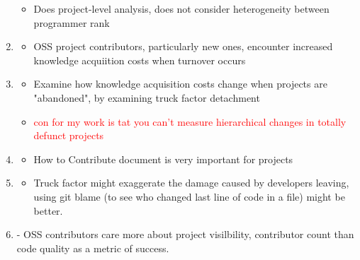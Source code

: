 \documentclass[12pt,notitlepage]{article}
\begin{document}
\begin{enumerate}
\begin{itemize}
        \item Does project-level analysis, does not consider heterogeneity between programmer rank 
    \end{itemize}
    \item \cite{rashid_exploring_2017} 
    \begin{itemize}
        \item OSS project contributors, particularly new ones, encounter increased knowledge acquiition costs when turnover occurs 
    \end{itemize}
    \item \cite{avelino_abandonment_2019}
    \begin{itemize}
        \item Examine how knowledge acquisition costs change when projects are "abandoned", by examining truck factor detachment
        \item \textcolor{red}{con for my work is tat you can't measure hierarchical changes in totally defunct projects}
    \end{itemize}
    \item \cite{hata_characteristics_2015}
    \begin{itemize}
        \item How to Contribute document is very important for projects
    \end{itemize}
    \item \cite{rigby_quantifying_2016}
    \begin{itemize}
        \item Truck factor might exaggerate the damage caused by developers leaving, using git blame (to see who changed last line of code in a file) might be better. 
    \end{itemize}
    \item \cite{mcdonald_performance_2013} - OSS contributors care more about project visilbility, contributor count than code quality as a metric of success. 
\end{enumerate}
\end{document}
